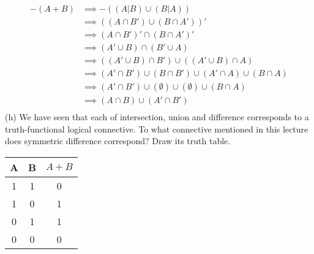 \documentclass{article}
\begin{document}
\begin{align*}
    -(A+B) &\implies -((A|B) \cup (B|A))\\
           &\implies ((A \cap B') \cup (B \cap A'))'\\
           &\implies (A \cap B')' \cap (B \cap A')'\\
           &\implies (A' \cup B) \cap (B' \cup A)\\
           &\implies ((A' \cup B) \cap B') \cup ((A' \cup B) \cap A)\\
           &\implies (A' \cap B') \cup (B \cap B') \cup (A' \cap A) \cup (B \cap A)\\
           &\implies (A' \cap B') \cup (\emptyset) \cup (\emptyset) \cup (B \cap A)\\
           &\implies (A \cap B) \cup (A' \cap B')\\
\end{align*}
(h) We have seen that each of intersection, union and difference corresponds to a truth-functional logical connective. To what connective mentioned in this lecture does symmetric difference correspond? Draw its truth table.
\begin{table}[h!]
    \label{tab:table1}
    \centering
    \begin{tabular}{c|c|c}
        \textbf{A} & \textbf{B} & \textbf{$A+B$}\\
        \hline
        1 & 1 & 0\\
        \hline
        1 & 0 & 1\\
        \hline
        0 & 1 & 1\\
        \hline
        0 & 0 & 0\\
    \end{tabular}
\end{table}
\end{document}
